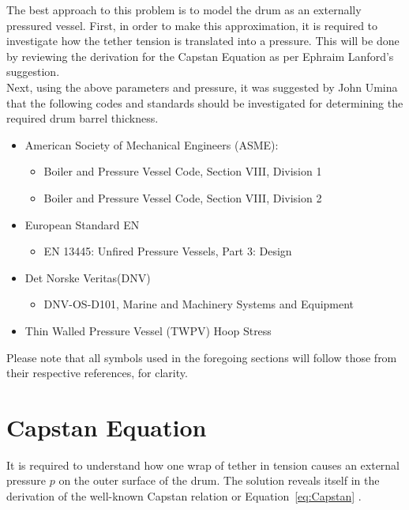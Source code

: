 The best approach to this problem is to model the drum as an externally pressured vessel. First, in order to make this approximation, it is required to investigate how the tether tension is translated into a pressure. This will be done by reviewing the derivation for the Capstan Equation as per Ephraim Lanford's suggestion.\\ 

Next, using the above parameters and pressure, it was suggested by John Umina that the following codes and standards should be investigated for determining the required drum barrel thickness.
\begin{itemize}
	\item American Society of Mechanical Engineers (ASME):
	      \begin{itemize}[label=$\bullet$]
	      	\item Boiler and Pressure Vessel Code, Section VIII, Division 1 \cite{ASMEbvpcVII1}
	      	\item Boiler and Pressure Vessel Code, Section VIII, Division 2 \cite{ASMEbvpcVII2}
	      \end{itemize}
	\item European Standard EN
	      \begin{itemize}[label=$\bullet$]
	      	\item EN 13445: Unfired Pressure Vessels, Part 3: Design \cite{EN134453}
	      \end{itemize}
	\item Det Norske Veritas(DNV)
	      \begin{itemize}[label=$\bullet$]
	      	\item DNV-OS-D101, Marine and Machinery Systems and Equipment \cite{DNVOSD101}
	      \end{itemize}
	\item Thin Walled Pressure Vessel (TWPV) Hoop Stress \cite{roarks}\\	
\end{itemize}

Please note that all symbols used in the foregoing sections will follow those from their respective references, for clarity.
\section{Capstan Equation}
It is required to understand how one wrap of tether in tension causes an external pressure $p$ on the outer surface of the drum. The solution reveals itself in the derivation of the well-known Capstan relation or Equation~\ref{eq:Capstan} \cite{capstanman}.

